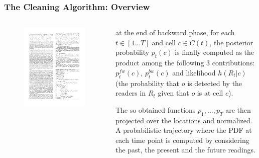 
\begin{frame}
\frametitle{The Cleaning Algorithm: Overview}

\begin{columns}

  \begin{figure}[tb]
    \includegraphics[width=\columnwidth]{figures/3-4/3-4-16.pdf}
  \end{figure}

  \begin{sitemize}
    \item at the end of backward phase, for each $t \in [1...T]$ and cell $c \in C(t)$, the posterior probability $p_t(c)$ is finally computed as the product among the following 3 contributions: $p^{fw}_t(c)$, $p^{bw}_t(c)$ and likelihood $h(R_t|c)$ (the probability that $o$ is detected by the readers in $R_t$ given that $o$ is at cell $c$).
    \item The so obtained functions $p_1, ..., p_T$ are then projected over the locations and normalized. A probabilistic trajectory where the PDF at each time point is computed by considering the past, the present and the future readings.
  \end{sitemize}

\end{columns}

\end{frame}

